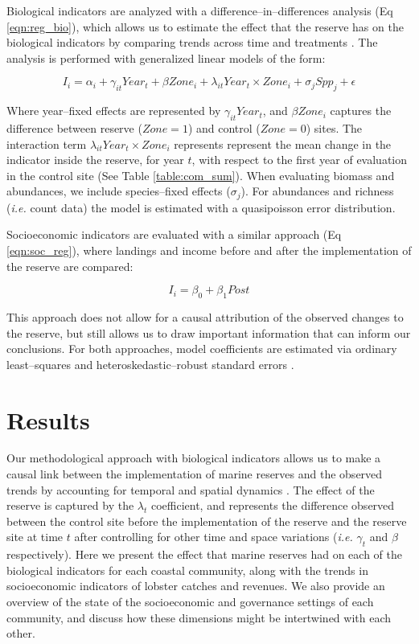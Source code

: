 \documentclass{frontiersSCNS}
\theoremstyle{definition}
\theoremstyle{definition}
\theoremstyle{definition}
\theoremstyle{remark}
\begin{document}
Biological indicators are analyzed with a difference--in--differences
analysis (Eq \ref{eqn:reg_bio}), which allows us to estimate the effect
that the reserve has on the biological indicators by comparing trends
across time and treatments
\citep{moland_2013-VP,Villasenor-Derbez_2018}. The analysis is performed
with generalized linear models of the form:

\begin{equation}
I_i = \alpha_{i} + \gamma_{it} Year_t + \beta Zone_i + \lambda_{it} Year_t\times Zone_i + \sigma_jSpp_j + \epsilon
\label{eqn:reg_bio}
\end{equation}

Where year--fixed effects are represented by \(\gamma_{it} Year_t\), and
\(\beta Zone_i\) captures the difference between reserve (\(Zone = 1\))
and control (\(Zone = 0\)) sites. The interaction term
\(\lambda_{it} Year_t\times Zone_i\) represents represent the mean
change in the indicator inside the reserve, for year \(t\), with respect
to the first year of evaluation in the control site (See Table
\ref{table:com_sum}). When evaluating biomass and abundances, we include
species--fixed effects (\(\sigma_j\)). For abundances and richness
(\emph{i.e.} count data) the model is estimated with a quasipoisson
error distribution.

Socioeconomic indicators are evaluated with a similar approach (Eq
\ref{eqn:soc_reg}), where landings and income before and after the
implementation of the reserve are compared:

\begin{equation}
I_i = \beta_0 + \beta_1Post
\label{eqn:soc_reg}
\end{equation}

This approach does not allow for a causal attribution of the observed
changes to the reserve, but still allows us to draw important
information that can inform our conclusions. For both approaches, model
coefficients are estimated via ordinary least--squares and
heteroskedastic--robust standard errors \citep{zeileis_2004-7n}.

\clearpage

\section{Results}\label{results}

Our methodological approach with biological indicators allows us to make
a causal link between the implementation of marine reserves and the
observed trends by accounting for temporal and spatial dynamics
\citep{depalma_2018}. The effect of the reserve is captured by the
\(\lambda_t\) coefficient, and represents the difference observed
between the control site before the implementation of the reserve and
the reserve site at time \(t\) after controlling for other time and
space variations (\emph{i.e.} \(\gamma_t\) and \(\beta\) respectively).
Here we present the effect that marine reserves had on each of the
biological indicators for each coastal community, along with the trends
in socioeconomic indicators of lobster catches and revenues. We also
provide an overview of the state of the socioeconomic and governance
settings of each community, and discuss how these dimensions might be
intertwined with each other.
\end{document}
